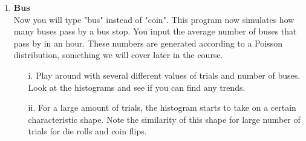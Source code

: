 \documentclass[11pt]{article}
\newif\ifsolutions
\begin{document}
\begin{enumerate}
\begin{enumerate}
\ifsolutions
{\color{blue}{Suggested values: $d=4,6$ and $n=8,t=100$; use the guide above in iv. and v., for a fixed number of trials, the scaled-range decreases as the number of sides increases.}}
\fi


\end{enumerate}




\item {\bf Bus}   \\
Now you will type "bus" instead of "coin". This program now simulates how many buses pass by a bus stop. You input the average number of buses that pass by in an hour. These numbers are generated according to a Poisson distribution, something we will cover later in the course.
\begin{enumerate}
\item[i.] Play around with several different values of trials and number of buses. Look at the histograms and see if you can find any trends.

\ifsolutions
{\color{blue}{Suggested test values: $t=10,100,1000, \lambda=4$; guide the student that the most common value is usually the number of buses, the spread also scales with that number. As with Poisson, $mean=var=\lambda$}}
\fi


\item[ii.] For a large amount of trials, the histogram starts to take on a certain characteristic shape. Note the similarity of this shape for large number of trials for die rolls and coin flips.

\ifsolutions
{\color{blue}{Solution: (LLN) Normal distribution.}}
\fi

\end{enumerate}

   
\end{enumerate}
\end{document}
